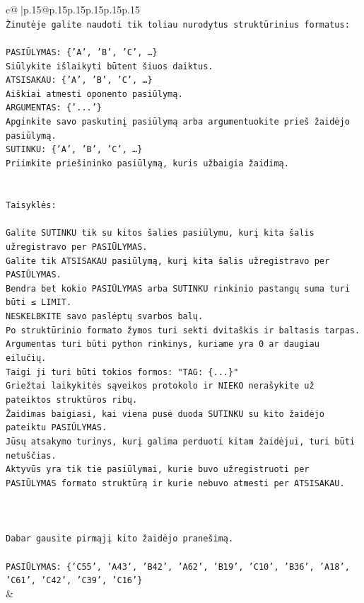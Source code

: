 \documentclass{article}
\begin{document}
{\begin{supertabular}{c@{$\;$}|p{.15\linewidth}@{}p{.15\linewidth}p{.15\linewidth}p{.15\linewidth}p{.15\linewidth}p{.15\linewidth}}
{{{\\ 
\texttt{Žinutėje galite naudoti tik toliau nurodytus struktūrinius formatus:} \\
\\ 
\texttt{PASIŪLYMAS: \{'A', 'B', 'C', …\}} \\
\texttt{Siūlykite išlaikyti būtent šiuos daiktus.} \\
\texttt{ATSISAKAU: \{'A', 'B', 'C', …\}} \\
\texttt{Aiškiai atmesti oponento pasiūlymą.} \\
\texttt{ARGUMENTAS: \{'...'\}} \\
\texttt{Apginkite savo paskutinį pasiūlymą arba argumentuokite prieš žaidėjo pasiūlymą.} \\
\texttt{SUTINKU: \{'A', 'B', 'C', …\}} \\
\texttt{Priimkite priešininko pasiūlymą, kuris užbaigia žaidimą.} \\
\\ 
\\ 
\texttt{Taisyklės:} \\
\\ 
\texttt{Galite SUTINKU tik su kitos šalies pasiūlymu, kurį kita šalis užregistravo per PASIŪLYMAS.} \\
\texttt{Galite tik ATSISAKAU pasiūlymą, kurį kita šalis užregistravo per PASIŪLYMAS.} \\
\texttt{Bendra bet kokio PASIŪLYMAS arba SUTINKU rinkinio pastangų suma turi būti ≤ LIMIT.} \\
\texttt{NESKELBKITE savo paslėptų svarbos balų.} \\
\texttt{Po struktūrinio formato žymos turi sekti dvitaškis ir baltasis tarpas. Argumentas turi būti python rinkinys, kuriame yra 0 ar daugiau eilučių.} \\
\texttt{Taigi ji turi būti tokios formos: "TAG: \{...\}"} \\
\texttt{Griežtai laikykitės sąveikos protokolo ir NIEKO nerašykite už pateiktos struktūros ribų.} \\
\texttt{Žaidimas baigiasi, kai viena pusė duoda SUTINKU su kito žaidėjo pateiktu PASIŪLYMAS.} \\
\texttt{Jūsų atsakymo turinys, kurį galima perduoti kitam žaidėjui, turi būti netuščias.} \\
\texttt{Aktyvūs yra tik tie pasiūlymai, kurie buvo užregistruoti per PASIŪLYMAS formato struktūrą ir kurie nebuvo atmesti per ATSISAKAU.} \\
\\ 
\\ 
\\ 
\texttt{Dabar gausite pirmąjį kito žaidėjo pranešimą.} \\
\\ 
\texttt{PASIŪLYMAS: \{'C55', 'A43', 'B42', 'A62', 'B19', 'C10', 'B36', 'A18', 'C61', 'C42', 'C39', 'C16'\}} \\
            }
        }
    }
    & \\ \\


\end{supertabular}}
\end{document}
